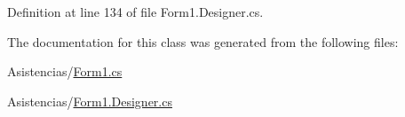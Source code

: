 Definition at line 134 of file Form1.\-Designer.\-cs.



The documentation for this class was generated from the following files\-:\begin{DoxyCompactItemize}
\item 
Asistencias/\hyperlink{_form1_8cs}{Form1.\-cs}\item 
Asistencias/\hyperlink{_form1_8_designer_8cs}{Form1.\-Designer.\-cs}\end{DoxyCompactItemize}
